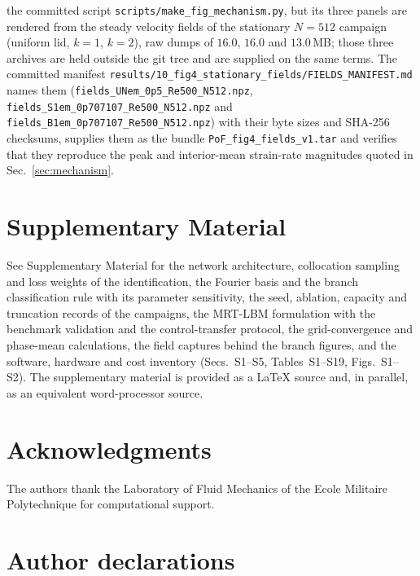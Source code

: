 \documentclass[11pt,a4paper]{article}
\begin{document}
the committed script \texttt{scripts/}\hspace{0pt}\texttt{make\_fig\_mechanism.py},
but its three panels are rendered from the steady velocity fields of the stationary
$N=512$ campaign (uniform lid, \(k=1\), \(k=2\)), raw dumps of $16.0$, $16.0$ and
$13.0$\,MB; those three archives are held outside the git tree and are supplied on
the same terms. The committed manifest
\texttt{results/10\_fig4}\hspace{0pt}\texttt{\_stationary\_fields/}\hspace{0pt}\texttt{FIELDS}\hspace{0pt}\texttt{\_MANIFEST.md}
names them (\texttt{fields\_UNem\_0p5\_Re500\_N512.npz},
\texttt{fields\_S1em\_0p707107\_Re500\_N512.npz} and
\texttt{fields\_B1em\_0p707107\_Re500\_N512.npz}) with their byte sizes and SHA-256
checksums, supplies them as the bundle
\texttt{PoF\_fig4}\hspace{0pt}\texttt{\_fields\_v1.tar} and verifies that they
reproduce the peak and interior-mean strain-rate magnitudes quoted in
Sec.~\ref{sec:mechanism}.

\section*{Supplementary Material}

See Supplementary Material for the network architecture,
collocation sampling and loss weights of the identification, the Fourier basis and
the branch classification rule with its parameter sensitivity, the seed, ablation,
capacity and truncation records of the campaigns, the MRT-LBM formulation with the
benchmark validation and the control-transfer protocol, the grid-convergence and
phase-mean calculations, the field captures behind the branch figures, and the
software, hardware and cost inventory (Secs.~S1--S5, Tables~S1--S19, Figs.~S1--S2).
The supplementary material is provided as a LaTeX source and, in parallel, as an
equivalent word-processor source.

\section*{Acknowledgments}
The authors thank the Laboratory of Fluid Mechanics of the Ecole Militaire
Polytechnique for computational support.

\section*{Author declarations}
\end{document}

